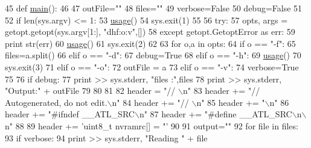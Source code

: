 \begin{DoxyCode}
45 \textcolor{keyword}{def }\hyperlink{namespacemkSrc_a397eab54ba44c6e689aba237b2f0ef0a}{main}():
46 
47     outFile=\textcolor{stringliteral}{""}
48     files=\textcolor{stringliteral}{""}
49     verbose=\textcolor{keyword}{False}
50     debug=\textcolor{keyword}{False}
51 
52     \textcolor{keywordflow}{if}  len(sys.argv) <= 1:
53         \hyperlink{namespacemkSrc_a2912f80b0972d6bef1ca6d6bd8dd97f8}{usage}()
54         sys.exit(1)
55 
56     \textcolor{keywordflow}{try}:
57         opts, args = getopt.getopt(sys.argv[1:], \textcolor{stringliteral}{"dhf:o:v"},[])
58     \textcolor{keywordflow}{except} getopt.GetoptError \textcolor{keyword}{as} err:
59         \textcolor{keywordflow}{print} str(err)
60         \hyperlink{namespacemkSrc_a2912f80b0972d6bef1ca6d6bd8dd97f8}{usage}()
61         sys.exit(2)
62 
63     \textcolor{keywordflow}{for} o,a \textcolor{keywordflow}{in} opts:
64         \textcolor{keywordflow}{if} o == \textcolor{stringliteral}{"-f"}:
65             files=a.split()
66         \textcolor{keywordflow}{elif} o == \textcolor{stringliteral}{"-d"}:
67             debug=\textcolor{keyword}{True}
68         \textcolor{keywordflow}{elif} o == \textcolor{stringliteral}{"-h"}:
69             \hyperlink{namespacemkSrc_a2912f80b0972d6bef1ca6d6bd8dd97f8}{usage}()
70             sys.exit(3)
71         \textcolor{keywordflow}{elif} o == \textcolor{stringliteral}{"-o"}:
72             outFile = a
73         \textcolor{keywordflow}{elif} o == \textcolor{stringliteral}{"-v"}:
74             verbose=\textcolor{keyword}{True}
75 
76     \textcolor{keywordflow}{if} debug:
77         \textcolor{keywordflow}{print} >> sys.stderr, \textcolor{stringliteral}{"files :"},files
78         \textcolor{keywordflow}{print} >> sys.stderr, \textcolor{stringliteral}{"Output:"} + outFile
79 
80 
81 
82     header =  \textcolor{stringliteral}{"// \(\backslash\)n"}
83     header +=  \textcolor{stringliteral}{"// Autogenerated, do not edit.\(\backslash\)n"}
84     header +=  \textcolor{stringliteral}{"// \(\backslash\)n"}
85     header += \textcolor{stringliteral}{"\(\backslash\)n"}
86     header +=  \textcolor{stringliteral}{"#ifndef \_\_ATL\_SRC\(\backslash\)n"}
87     header +=  \textcolor{stringliteral}{"#define \_\_ATL\_SRC\(\backslash\)n\(\backslash\)n"}
88 
89     header += \textcolor{stringliteral}{'uint8\_t nvramrc[] = "'}
90 
91     output=\textcolor{stringliteral}{""}
92     \textcolor{keywordflow}{for} file \textcolor{keywordflow}{in} files:
93         \textcolor{keywordflow}{if} verbose:
94             \textcolor{keywordflow}{print} >> sys.stderr, \textcolor{stringliteral}{"Reading "} + file

\end{DoxyCode}
